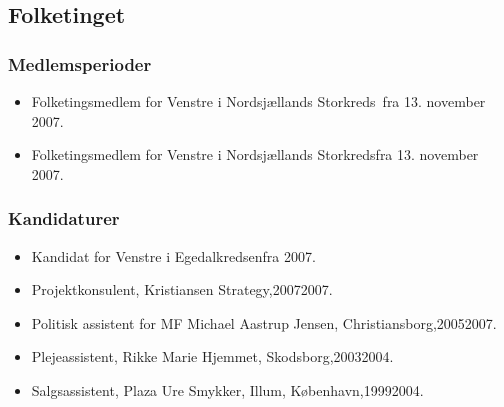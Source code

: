 \documentclass[11pt, a4paper]{awesome-cv}
\begin{document}
\begin{cvletter}
\subsection*{Folketinget}
\subsubsection*{Medlemsperioder}
\begin{itemize}
\item Folketingsmedlem for Venstre i Nordsjællands Storkreds fra 13. november 2007.
\item Folketingsmedlem for Venstre i Nordsjællands Storkredsfra 13. november 2007.
\end{itemize}
\subsubsection*{Kandidaturer}
\begin{itemize}
\item Kandidat for Venstre i Egedalkredsenfra 2007.
\end{itemize}
\begin{itemize}
\item Projektkonsulent, Kristiansen Strategy,20072007.
\item Politisk assistent for MF Michael Aastrup Jensen, Christiansborg,20052007.
\item Plejeassistent, Rikke Marie Hjemmet, Skodsborg,20032004.
\item Salgsassistent, Plaza Ure  Smykker, Illum, København,19992004.
\end{itemize}
\end{cvletter}
\end{document}
